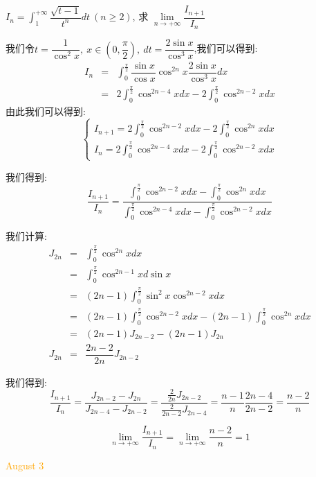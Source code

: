 \begin{example}[][Exam: 34.1.4]
	$I_{n}=\int_{1}^{+\infty}\dfrac{\sqrt{t-1}}{t^n}dt\ (n\geq 2)$, 求 $\lim\limits_{n\to+\infty}\dfrac{I_{n+1}}{I_{n}}$
\end{example}
\begin{solution}
	
	我们令$t=\dfrac{1}{\cos^2 x},\ x\in(0,\dfrac{\pi}{2}),\ dt=\dfrac{2\sin x}{\cos^3 x}$,我们可以得到: 
	\begin{eqnarray*}
		I_{n}&=&\int_{0}^{\frac{\pi}{2}}\dfrac{\sin x}{\cos x}\cos^{2n}x\dfrac{2\sin x}{\cos^3 x}dx\\
		&=&2\int_{0}^{\frac{\pi}{2}}\cos^{2n-4}xdx-2\int_{0}^{\frac{\pi}{2}}\cos^{2n-2}xdx
	\end{eqnarray*}
	由此我们可以得到: 
	$$\left\lbrace
	\begin{array}{l}
		I_{n+1}=2\int_{0}^{\frac{\pi}{2}}\cos^{2n-2}xdx-2\int_{0}^{\frac{\pi}{2}}\cos^{2n}xdx\\
		I_{n}=2\int_{0}^{\frac{\pi}{2}}\cos^{2n-4}xdx-2\int_{0}^{\frac{\pi}{2}}\cos^{2n-2}xdx
	\end{array}
	\right. $$
	
	我们得到: 
	$$\dfrac{I_{n+1}}{I_{n}}=\dfrac{\int_{0}^{\frac{\pi}{2}}\cos^{2n-2}xdx-\int_{0}^{\frac{\pi}{2}}\cos^{2n}xdx}{\int_{0}^{\frac{\pi}{2}}\cos^{2n-4}xdx-\int_{0}^{\frac{\pi}{2}}\cos^{2n-2}xdx}$$
	
	我们计算: 
	\begin{eqnarray*}
		J_{2n}&=&\int_{0}^{\frac{\pi}{2}}\cos^{2n}xdx\\
		&=&\int_{0}^{\frac{\pi}{2}}\cos^{2n-1}xd\sin x\\
		&=&(2n-1)\int_{0}^{\frac{\pi}{2}}\sin^{2} x\cos^{2n-2}xdx\\
		&=&(2n-1)\int_{0}^{\frac{\pi}{2}}\cos^{2n-2}xdx-(2n-1)\int_{0}^{\frac{\pi}{2}}\cos^{2n}xdx\\
		&=&(2n-1)J_{2n-2}-(2n-1)J_{2n}\\
		J_{2n}&=&\dfrac{2n-2}{2n}J_{2n-2}
	\end{eqnarray*}

	我们得到: 
	$$\dfrac{I_{n+1}}{I_{n}}=\dfrac{J_{2n-2}-J_{2n}}{J_{2n-4}-J_{2n-2}}=\dfrac{\frac{2}{2n}J_{2n-2}}{\frac{2}{2n-2}J_{2n-4}}=\dfrac{n-1}{n}\dfrac{2n-4}{2n-2}=\dfrac{n-2}{n}$$
	
	$$\lim\limits_{n\to+\infty}\dfrac{I_{n+1}}{I_{n}}=\lim\limits_{n\to+\infty}\dfrac{n-2}{n}=1$$
\end{solution}


\textcolor{orange}{August 3}


